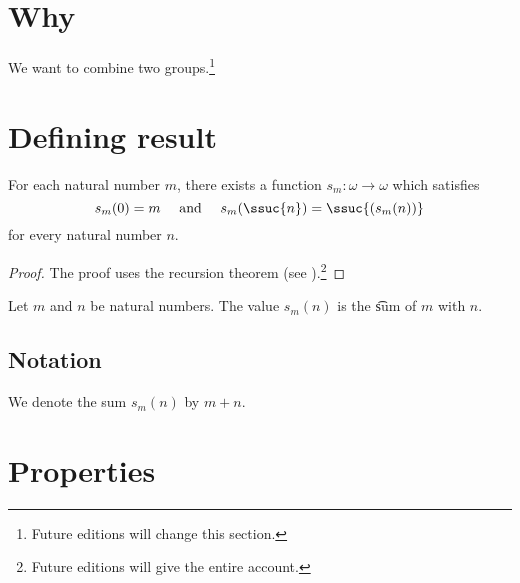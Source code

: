 

\section*{Why}

We want to combine two groups.\footnote{Future editions will change this section.}

\section*{Defining result}

\begin{proposition}
For each natural number $m$, there exists a function $s_m: \omega  \to \omega $ which satisfies
\[
s_m(0) = m \quad \text{ and } \quad s_m(\ssuc{n}) = \ssuc{(s_m(n))}
\]
for every natural number $n$.
\end{proposition}

\begin{proof}The proof uses the recursion theorem (see ).\footnote{Future editions will give the entire account.}\end{proof}
Let $m$ and $n$ be natural numbers.
The value $s_m(n)$ is the \t{sum} of $m$ with $n$.


\subsection*{Notation}

We denote the sum $s_m(n)$ by $m + n$.

\section*{Properties}

